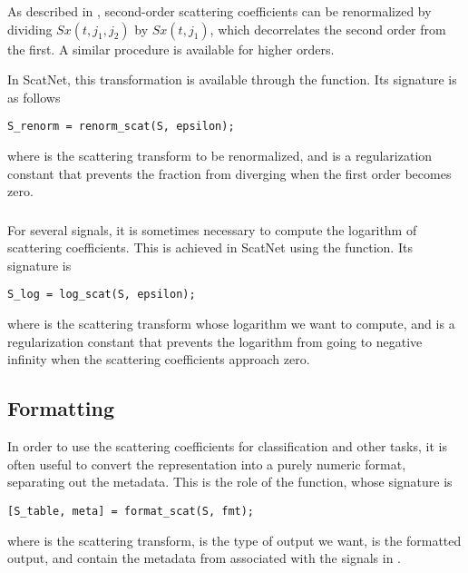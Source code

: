 \documentclass[twocolumn]{article}
\begin{document}
\subsubsection{}
As described in \cite{joakim}, second-order scattering coefficients can be renormalized by dividing $Sx(t,j_1,j_2)$ by $Sx(t,j_1)$, which decorrelates the second order from the first. A similar procedure is available for higher orders.

In ScatNet, this transformation is available through the  function. Its signature is as follows
\begin{lstlisting}
S_renorm = renorm_scat(S, epsilon);
\end{lstlisting}
where  is the scattering transform to be renormalized, and  is a regularization constant that prevents the fraction from diverging when the first order becomes zero.

\subsubsection{}
For several signals, it is sometimes necessary to compute the logarithm of scattering coefficients. This is achieved in ScatNet using the  function. Its signature is
\begin{lstlisting}
S_log = log_scat(S, epsilon);
\end{lstlisting}
where  is the scattering transform whose logarithm we want to compute, and  is a regularization constant that prevents the logarithm from going to negative infinity when the scattering coefficients approach zero.

\subsubsection{}

\subsection{Formatting}

In order to use the scattering coefficients for classification and other tasks, it is often useful to convert the representation into a purely numeric format, separating out the metadata. This is the role of the  function, whose signature is
\begin{lstlisting}
[S_table, meta] = format_scat(S, fmt);
\end{lstlisting}
where  is the scattering transform,  is the type of output we want,  is the formatted output, and  contain the metadata from  associated with the signals in .
\end{document}
